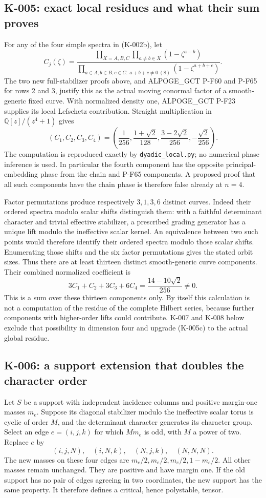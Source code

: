 \subsection{K-005: exact local residues and what their sum proves}
For any of the four simple spectra in (K-002b), let
\[
 C_j(\zeta)=
 \frac{\prod_{X=A,B,C}\prod_{a\ne b\in X}(1-\zeta^{a-b})}
 {\prod_{a\in A,b\in B,c\in C:\ a+b+c\ne0\ (8)}
       (1-\zeta^{a+b+c})}.                                   \tag{K-005a}
\]
The two new full-stabilizer proofs above, and ALPOGE\_GCT P-F60 and
P-F65 for rows 2 and 3, justify this as the actual moving conormal
factor of a smooth-generic fixed curve. With normalized density one,
ALPOGE\_GCT P-F23 supplies its local Lefschetz contribution.
Straight multiplication in $\mathbb Q[z]/(z^4+1)$ gives
\[
 (C_1,C_2,C_3,C_4)=
 \left(\frac1{256},\frac{1+\sqrt2}{128},
       \frac{3-2\sqrt2}{256},-\frac{\sqrt2}{256}\right).          \tag{K-005b}
\]
The computation is reproduced exactly by \texttt{dyadic\_local.py};
no numerical phase inference is used. In particular the fourth
component has the opposite principal-embedding phase from the
chain and P-F65 components. A proposed proof that all such
components have the chain phase is therefore false already at $n=4$.

Factor permutations produce respectively $3,1,3,6$ distinct curves.
Indeed their ordered spectra modulo scalar shifts distinguish them:
with a faithful determinant character and trivial effective
stabilizer, a prescribed grading generator has a unique lift modulo
the ineffective scalar kernel. An equivalence between two such
points would therefore identify their ordered spectra modulo those
scalar shifts. Enumerating those shifts and the six factor
permutations gives the stated orbit sizes. Thus there are at least
thirteen distinct smooth-generic curve components. Their combined
normalized coefficient is
\[
 3C_1+C_2+3C_3+6C_4=\frac{14-10\sqrt2}{256}\ne0.               \tag{K-005c}
\]
This is a sum over these thirteen components only. By itself this calculation is not a computation of the
residue of the complete Hilbert series, because further components
with higher-order lifts could contribute. K-007 and K-008 below
exclude that possibility in dimension four and upgrade (K-005c) to
the actual global residue.

\subsection{K-006: a support extension that doubles the character order}
Let $S$ be a support with independent incidence columns and positive
margin-one masses $m_e$. Suppose its diagonal stabilizer modulo the
ineffective scalar torus is cyclic of order $M$, and the determinant
character generates its character group. Select an edge
$e=(i,j,k)$ for which $Mm_e$ is odd, with $M$ a power of two.
Replace $e$ by
\[
 (i,j,N),\quad(i,N,k),\quad(N,j,k),\quad(N,N,N).                \tag{K-006a}
\]
The new masses on these four edges are
$m_e/2,m_e/2,m_e/2,1-m_e/2$. All other masses remain unchanged.
They are positive and have margin one. If the old support has no
pair of edges agreeing in two coordinates, the new support has the
same property. It therefore defines a critical, hence polystable,
tensor.

